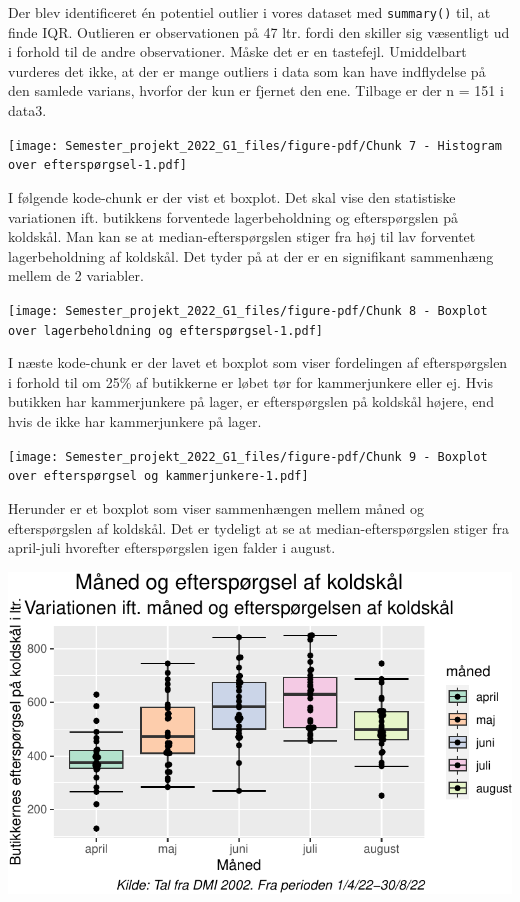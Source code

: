 \documentclass[
  12pt,
  a4paper,
  DIV=11,
  numbers=noendperiod]{scrartcl}
\begin{document}
Der blev identificeret én potentiel outlier i vores dataset med
\texttt{summary()} til, at finde IQR. Outlieren er observationen på 47
ltr. fordi den skiller sig væsentligt ud i forhold til de andre
observationer. Måske det er en tastefejl. Umiddelbart vurderes det ikke,
at der er mange outliers i data som kan have indflydelse på den samlede
varians, hvorfor der kun er fjernet den ene. Tilbage er der n = 151 i
data3.

\texttt{[image: Semester\_projekt\_2022\_G1\_files/figure-pdf/Chunk 7 - Histogram over efterspørgsel-1.pdf]}

I følgende kode-chunk er der vist et boxplot. Det skal vise den
statistiske variationen ift. butikkens forventede lagerbeholdning og
efterspørgslen på koldskål. Man kan se at median-efterspørgslen stiger
fra høj til lav forventet lagerbeholdning af koldskål. Det tyder på at
der er en signifikant sammenhæng mellem de 2 variabler.

\texttt{[image: Semester\_projekt\_2022\_G1\_files/figure-pdf/Chunk 8 - Boxplot over lagerbeholdning og efterspørgsel-1.pdf]}

I næste kode-chunk er der lavet et boxplot som viser fordelingen af
efterspørgslen i forhold til om 25\% af butikkerne er løbet tør for
kammerjunkere eller ej. Hvis butikken har kammerjunkere på lager, er
efterspørgslen på koldskål højere, end hvis de ikke har kammerjunkere på
lager.

\texttt{[image: Semester\_projekt\_2022\_G1\_files/figure-pdf/Chunk 9 - Boxplot over efterspørgsel og kammerjunkere-1.pdf]}

Herunder er et boxplot som viser sammenhængen mellem måned og
efterspørgslen af koldskål. Det er tydeligt at se at
median-efterspørgslen stiger fra april-juli hvorefter efterspørgslen
igen falder i august.

\includegraphics{Semester_projekt_2022_G1_files/figure-pdf/Chunk 10 - Boxplot over efterspørgsel og måned-1.pdf}
\end{document}
